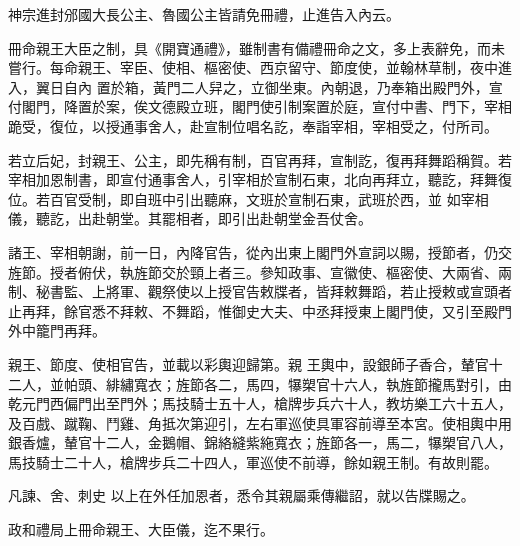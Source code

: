 \begin{pinyinscope}
 神宗進封邠國大長公主、魯國公主皆請免冊禮，止進告入內云。



 冊命親王大臣之制，具《開寶通禮》，雖制書有備禮冊命之文，多上表辭免，而未嘗行。每命親王、宰臣、使相、樞密使、西京留守、節度使，並翰林草制，夜中進入，翼日自內
 置於箱，黃門二人舁之，立御坐東。內朝退，乃奉箱出殿門外，宣付閣門，降置於案，俟文德殿立班，閣門使引制案置於庭，宣付中書、門下，宰相跪受，復位，以授通事舍人，赴宣制位唱名訖，奉詣宰相，宰相受之，付所司。



 若立后妃，封親王、公主，即先稱有制，百官再拜，宣制訖，復再拜舞蹈稱賀。若宰相加恩制書，即宣付通事舍人，引宰相於宣制石東，北向再拜立，聽訖，拜舞復位。若百官受制，即自班中引出聽麻，文班於宣制石東，武班於西，並
 如宰相儀，聽訖，出赴朝堂。其罷相者，即引出赴朝堂金吾仗舍。



 諸王、宰相朝謝，前一日，內降官告，從內出東上閣門外宣詞以賜，授節者，仍交旌節。授者俯伏，執旌節交於頸上者三。參知政事、宣徽使、樞密使、大兩省、兩制、秘書監、上將軍、觀祭使以上授官告敕牒者，皆拜敕舞蹈，若止授敕或宣頭者止再拜，餘官悉不拜敕、不舞蹈，惟御史大夫、中丞拜授東上閣門使，又引至殿門外中籠門再拜。



 親王、節度、使相官告，並載以彩輿迎歸第。親
 王輿中，設銀師子香合，輦官十二人，並帕頭、緋繡寬衣；旌節各二，馬四，犦槊官十六人，執旌節攏馬對引，由乾元門西偏門出至門外；馬技騎士五十人，槍牌步兵六十人，教坊樂工六十五人，及百戲、蹴鞠、鬥雞、角抵次第迎引，左右軍巡使具軍容前導至本宮。使相輿中用銀香爐，輦官十二人，金鵝帽、錦絡縫紫絁寬衣；旌節各一，馬二，犦槊官八人，馬技騎士二十人，槍牌步兵二十四人，軍巡使不前導，餘如親王制。有故則罷。



 凡諫、舍、刺史
 以上在外任加恩者，悉令其親屬乘傳繼詔，就以告牒賜之。



 政和禮局上冊命親王、大臣儀，迄不果行。



\end{pinyinscope}